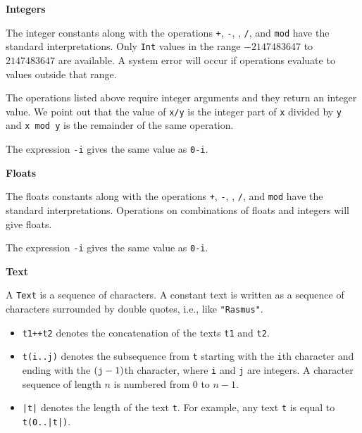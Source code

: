 \documentclass[a4,14pt,latin1]{article}
\begin{document}
\vspace{2ex}
{\bf Integers}

The integer constants along with the operations
{\tt +}, {\tt -}, {\tt *}, {\tt /}, and {\tt mod}
have the standard interpretations. Only {\tt Int} values in the range
$-2147483647$ to $2147483647$ are available.
A system error will occur if operations evaluate to
values outside that range.

The operations listed above require integer arguments
and they return an integer value.
We point out that the value of {\tt x/y} is the integer part
of {\tt x} divided by {\tt y} and {\tt x mod y} is the remainder
of the same operation.

The expression {\tt -i} gives the same value as {\tt 0-i}.


{\bf Floats}

The floats constants along with the operations
{\tt +}, {\tt -}, {\tt *}, {\tt /}, and {\tt mod}
have the standard interpretations. Operations on combinations of floats and integers will give floats.

The expression {\tt -i} gives the same value as {\tt 0-i}.

\vspace{2ex}
{\bf Text}

A {\tt Text} is a sequence of characters. A constant text is written as
a sequence of characters surrounded by double quotes,
i.e., like {\tt "Rasmus"}.
\begin{itemize}
\item
{\tt t1++t2} denotes the concatenation of the texts {\tt t1} and {\tt t2}.
\item
{\tt t(i..j)} denotes the subsequence from {\tt t} starting with the
{\tt i}th character and ending with the $(\mbox{\tt j}-1)$th character,
where {\tt i} and {\tt j} are integers. A character sequence of length $n$ is
numbered from $0$ to $n-1$.
\item
{\tt |t|} denotes the length of the text {\tt t}. For example, any
text {\tt t} is equal to {\tt t(0..|t|)}.
\end{itemize}
\end{document}
